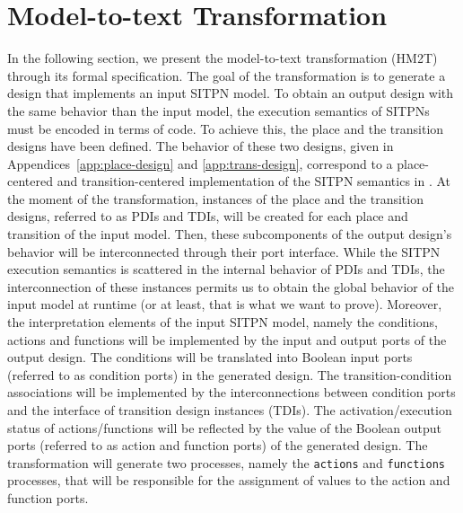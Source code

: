 \documentclass[pdflatex,sn-mathphys]{sn-jnl}%
\theoremstyle{thmstyleone}%
\theoremstyle{thmstyletwo}%
\theoremstyle{thmstylethree}%
\begin{document}
\section{Model-to-text Transformation}
\label{sec:m2t}

In the following section, we present the \hilecop{} model-to-text
transformation (HM2T) through its formal specification. The goal of
the transformation is to generate a \hvhdl{} design that implements an
input SITPN model. To obtain an output design with the same behavior
than the input model, the execution semantics of SITPNs must be
encoded in terms of \vhdl{} code. To achieve this, the place and the
transition designs have been defined. The behavior of these two
designs, given in Appendices~\ref{app:place-design} and
\ref{app:trans-design}, correspond to a place-centered and
transition-centered implementation of the SITPN semantics in
\vhdl{}. At the moment of the transformation, instances of the place
and the transition designs, referred to as PDIs and TDIs, will be
created for each place and transition of the input model. Then, these
subcomponents of the output design's behavior will be interconnected
through their port interface.  While the SITPN execution semantics is
scattered in the internal behavior of PDIs and TDIs, the
interconnection of these instances permits us to obtain the global
behavior of the input model at runtime (or at least, that is what we
want to prove). Moreover, the interpretation elements of the input
SITPN model, namely the conditions, actions and functions will be
implemented by the input and output ports of the output design. The
conditions will be translated into Boolean input ports (referred to as
condition ports) in the generated design. The transition-condition
associations will be implemented by the interconnections between
condition ports and the interface of transition design instances
(TDIs). The activation/execution status of actions/functions will be
reflected by the value of the Boolean output ports (referred to as
action and function ports) of the generated design. The transformation
will generate two processes, namely the \texttt{actions} and
\texttt{functions} processes, that will be responsible for the
assignment of values to the action and function ports.
\end{document}
